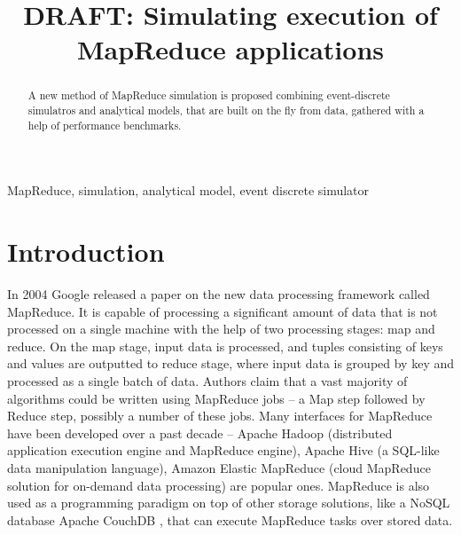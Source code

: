 \documentclass[conference]{IEEEtran} \IEEEoverridecommandlockouts
\begin{document}
 \title{DRAFT: Simulating execution of MapReduce applications}

    \author{ 
    }

    \maketitle

    \begin{abstract} 
    A new method of MapReduce simulation is proposed combining
    event-discrete simulatros and analytical models, that are built on the fly
    from data, gathered with a help of performance benchmarks.
    \end{abstract}

    \begin{IEEEkeywords} 
        MapReduce, simulation, analytical model, event discrete simulator
    \end{IEEEkeywords}

    \section{Introduction}
    In 2004 Google released a paper \cite{google_mapreduce} on the new data
    processing framework called MapReduce. It is capable of processing a
    significant amount of data that is not processed on a single machine with
    the help of two processing stages: map and reduce. On the map stage, input
    data is processed, and tuples consisting of keys and values are outputted
    to reduce stage, where input data is grouped by key and processed as a
    single batch of data. Authors claim that a vast majority of algorithms
    could be written using MapReduce jobs -- a Map step followed by Reduce
    step, possibly a number of these jobs. Many interfaces for MapReduce have
    been developed over a past decade -- Apache Hadoop \cite{apache_hadoop} (distributed application
    execution engine and MapReduce engine), Apache Hive \cite{apache_hive} (a SQL-like data
    manipulation language), Amazon Elastic MapReduce \cite{amazon_emr} (cloud MapReduce solution
    for on-demand data processing) are popular ones. MapReduce is also used as
    a programming paradigm on top of other storage solutions, like a NoSQL
    database Apache CouchDB \cite{apache_couchdb}, that can execute MapReduce tasks over stored data.
\end{document}
